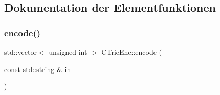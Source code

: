 \subsection{Dokumentation der Elementfunktionen}
\mbox{\label{class_c_trie_enc_a14832d9694f7aa5ba9d7d32d3a3c0793}} 
\subsubsection{\texorpdfstring{encode()}{encode()}}
{\footnotesize\ttfamily std\+::vector$<$ unsigned int $>$ C\+Trie\+Enc\+::encode (\begin{DoxyParamCaption}\item[{const std\+::string \&}]{in }\end{DoxyParamCaption})}

